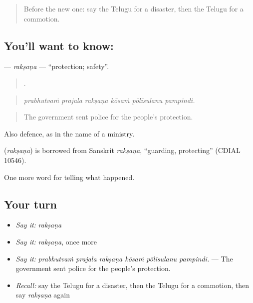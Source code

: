 \label{lesson:TE-C377-raksana}



\begin{quote}
Before the new one: say the Telugu for a disaster, then the Telugu for a commotion.
\end{quote}

\subsection*{You'll want to know: }
\textbf{} — \emph{rakṣaṇa} — \textquotedblleft{}protection; safety\textquotedblright{}.

\begin{quote}
     .
\end{quote}

\begin{quote}
\emph{prabhutvaṁ prajala rakṣaṇa kōsaṁ pōlīsulanu pampindi.}
\end{quote}

\begin{quote}
The government sent police for the people's protection.
\end{quote}

Also defence, as in the name of a ministry.

\begin{cousinweb}
\textbf{} (\emph{rakṣaṇa}) is borrowed from Sanskrit \emph{rakṣaṇa}, \textquotedblleft{}guarding, protecting\textquotedblright{} (CDIAL 10546).
\end{cousinweb}

\begin{grammarlens}[title={What you've built}]
One more word for telling what happened.
\end{grammarlens}

\subsection*{Your turn}
\begin{itemize}
\raggedright
  \item \emph{Say it:} \emph{rakṣaṇa}
  \item \emph{Say it:} \emph{rakṣaṇa}, once more
  \item \emph{Say it:} \emph{prabhutvaṁ prajala rakṣaṇa kōsaṁ pōlīsulanu pampindi.} — The government sent police for the people's protection.
  \item \emph{Recall:} say the Telugu for a disaster, then the Telugu for a commotion, then say \emph{rakṣaṇa} again
\end{itemize}

